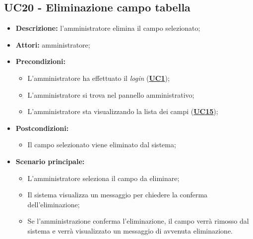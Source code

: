 \subsection{UC20 - Eliminazione campo tabella}
\label{sec:UC20}
\begin{itemize}
	\item \textbf{Descrizione:} l’amministratore elimina il campo selezionato;
	\item \textbf{Attori:} amministratore;
	\item \textbf{Precondizioni:} 
	\begin{itemize}
		\item L’amministratore ha effettuato il \textit{login} (\hyperref[sec:UC1]{\textbf{UC1}});
		\item L’amministratore si trova nel pannello amministrativo;
		\item L’amministratore sta visualizzando la lista dei campi (\hyperref[sec:UC15]{\textbf{UC15}});
	\end{itemize}
	\item \textbf{Postcondizioni:} 
	\begin{itemize}
		\item Il campo selezionato viene eliminato dal sistema;
	\end{itemize}
	\item \textbf{Scenario principale:} 
	\begin{itemize}
		\item L'amministratore seleziona il campo da eliminare;
		\item Il sistema visualizza un messaggio per chiedere la conferma dell'eliminazione;
		\item Se l'amministrazione conferma l'eliminazione, il campo verrà rimosso dal sistema e verrà visualizzato un messaggio di avvenuta eliminazione.
	\end{itemize}
\end{itemize}


